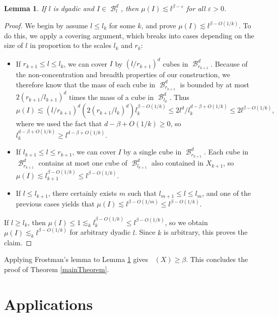 \documentclass[dvipsnames,letterpaper,12pt]{article}
\numberwithin{equation}{section}
\theoremstyle{plain}
\newtheorem{lemma}{Lemma}
\DeclareMathOperator{\hausdim}{\dim_{\mathbf{H}}}
\DeclareMathOperator{\B}{\mathcal{B}}
\begin{document}
\begin{lemma} \label{frostmanBound}
	If $l$ is dyadic and $I \in \B_l^d$, then $\mu(I) \lesssim l^{\beta - \varepsilon}$ for all $\varepsilon > 0$.
\end{lemma}
\begin{proof}
	We begin by assume $l \leq l_k$ for some $k$, and prove $\mu(I) \lesssim l^{\beta - O(1/k)}$. To do this, we apply a covering argument, which breaks into cases depending on the size of $l$ in proportion to the scales $l_k$ and $r_k$:
	\begin{itemize}
		\item If $r_{k+1} \leq l \leq l_k$, we can cover $I$ by $(l/r_{k+1})^d$ cubes in $\B^d_{r_{k+1}}$. Because of the non-concentration and breadth properties of our construction, we therefore know that the mass of each cube in $\B^d_{r_{k+1}}$ is bounded by at most $2 (r_{k+1}/l_{k+1})^d$ times the mass of a cube in $\B_{l_k}^d$. Thus
		\[ \mu(I) \lesssim (l/r_{k+1})^d (2(r_{k+1}/l_k)^d) l_k^{\beta - O(1/k)} \leq 2l^d/l_k^{d - \beta + O(1/k)} \leq 2l^{\beta - O(1/k)}, \]
		where we used the fact that $d - \beta + O(1/k) \geq 0$, so $l_k^{d - \beta + O(1/k)} \geq l^{d - \beta + O(1/k)}$.

		\item If $l_{k+1} \leq l \leq r_{k+1}$, we can cover $I$ by a single cube in $\B^d_{r_{k+1}}$. Each cube in $\B^d_{r_{k+1}}$ contains at most one cube of $\B^d_{l_{k+1}}$ also contained in $X_{k+1}$, so $\mu(I) \lesssim l_{k+1}^{\beta - O(1/k)} \leq l^{\beta - O(1/k)}$.

		\item If $l \leq l_{k+1}$, there certainly exists $m$ such that $l_{m+1} \leq l \leq l_m$, and one of the previous cases yields that $\mu(I) \lesssim l^{\beta - O(1/m)} \leq l^{\beta - O(1/k)}$.
	\end{itemize}
	If $l \geq l_k$, then $\mu(I) \leq 1 \lesssim_k l_k^{\beta - O(1/k)} \leq l^{\beta - O(1/k)}$, so we obtain $\mu(I) \lesssim_k l^{\beta - O(1/k)}$ for arbitrary dyadic $l$. Since $k$ is arbitrary, this proves the claim.
\end{proof}

Applying Frostman's lemma to Lemma \ref{frostmanBound} gives $\hausdim(X) \geq \beta$. This concludes the proof of Theorem \ref{mainTheorem}.









\section{Applications}\label{applications}
\end{document}
